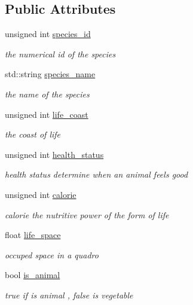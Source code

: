 \subsection*{Public Attributes}
\begin{DoxyCompactItemize}
\item 
unsigned int \hyperlink{structSpeciesInfo_a528e7f60fc35e38b4f6b12077b0237bc}{species\_\-id}
\begin{DoxyCompactList}\small\item\em the numerical id of the species \end{DoxyCompactList}\item 
std::string \hyperlink{structSpeciesInfo_a62ef1cee8c0611138084f8ae6e99a665}{species\_\-name}
\begin{DoxyCompactList}\small\item\em the name of the species \end{DoxyCompactList}\item 
unsigned int \hyperlink{structSpeciesInfo_a5582008c964055461a2cf00d4d727196}{life\_\-coast}
\begin{DoxyCompactList}\small\item\em the coast of life \end{DoxyCompactList}\item 
unsigned int \hyperlink{structSpeciesInfo_a197bc2a04a0dcfab7e7f48df80d73b1f}{health\_\-status}
\begin{DoxyCompactList}\small\item\em health status determine when an animal feels good \end{DoxyCompactList}\item 
unsigned int \hyperlink{structSpeciesInfo_a48f9d7283ac97e3658ba596eefa777ab}{calorie}
\begin{DoxyCompactList}\small\item\em calorie the nutritive power of the form of life \end{DoxyCompactList}\item 
float \hyperlink{structSpeciesInfo_afec7fed12e22abfef5032407e9042d98}{life\_\-space}
\begin{DoxyCompactList}\small\item\em occuped space in a quadro \end{DoxyCompactList}\item 
bool \hyperlink{structSpeciesInfo_a25738d8f07439886c95c5501c3b07259}{is\_\-animal}
\begin{DoxyCompactList}\small\item\em true if is animal , false is vegetable \end{DoxyCompactList}\item 

\end{DoxyCompactItemize}
